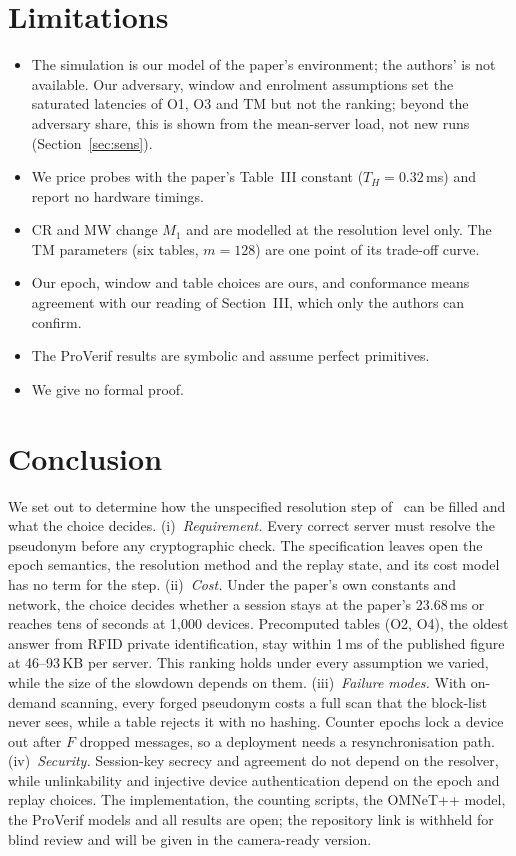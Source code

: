 \section{Limitations}
\begin{itemize}
\item The simulation is our model of the paper's environment; the authors' is not available. Our adversary, window and
enrolment assumptions set the saturated latencies of O1, O3 and TM but not the ranking; beyond the adversary share, this
is shown from the mean-server load, not new runs (Section~\ref{sec:sens}).
\item We price probes with the paper's Table~III constant ($T_H=0.32$\,ms) and report no hardware timings.
\item CR and MW change $M_1$ and are modelled at the resolution level only. The TM parameters (six tables, $m=128$) are
one point of its trade-off curve.
\item Our epoch, window and table choices are ours, and conformance means agreement with our reading of Section~III,
which only the authors can confirm.
\iffv
\item The ProVerif results are symbolic and assume perfect primitives.
\else
\item We give no formal proof.
\fi
\end{itemize}

\section{Conclusion}
We set out to determine how the unspecified resolution step of~\cite{base} can be filled and what the choice decides.
(i)~\emph{Requirement.} Every correct server must resolve the pseudonym before any cryptographic check. The specification
leaves open the epoch semantics, the resolution method and the replay state, and its cost model has no term for the step.
(ii)~\emph{Cost.} Under the paper's own constants and network, the choice decides whether a session stays at the paper's
23.68\,ms or reaches tens of seconds at 1{,}000 devices. Precomputed tables (O2, O4), the oldest answer from RFID private
identification, stay within 1\,ms of the published figure at 46--93\,KB per server. This ranking holds under every
assumption we varied, while the size of the slowdown depends on them.
(iii)~\emph{Failure modes.} With on-demand scanning, every forged pseudonym costs a full scan that the block-list never
sees, while a table rejects it with no hashing. Counter epochs lock a device out after $F$ dropped messages, so a
deployment needs a resynchronisation path.
\iffv
(iv)~\emph{Security.} Session-key secrecy and agreement do not depend on the resolver, while unlinkability and injective
device authentication depend on the epoch and replay choices.
\fi
The implementation, the counting scripts, the OMNeT++ model\iffv, the ProVerif models\fi{} and all results are open; the repository link is withheld for blind review and will be given in the camera-ready version.



